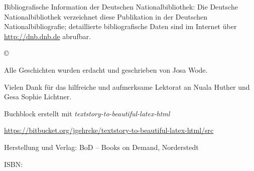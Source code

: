 \thispagestyle{empty}

\vspace*{\fill}

{\small
\noindent
Bibliografische Information der Deutschen Nationalbibliothek:
Die Deutsche Nationalbibliothek verzeichnet diese Publikation in der Deutschen Nationalbibliografie; detaillierte bibliografische Daten sind im Internet über 
\url{http://dnb.dnb.de} abrufbar.

\vspace*{0.06\textheight}
\noindent
© {\the\year} \storyauthor

\vspace{0.03\textheight}\noindent
Alle Geschichten wurden erdacht und geschrieben von Josa Wode.

\vspace{0.03\textheight}\noindent
Vielen Dank für das hilfreiche und aufmerksame Lektorat an Nuala Huther und Gesa Sophie Lichtner.

\vspace{0.03\textheight}\noindent
Buchblock erstellt mit \textit{textstory-to-beautiful-latex-html}

{\noindent\scriptsize \url{https://bitbucket.org/jgehrcke/textstory-to-beautiful-latex-html/src}}

\vspace*{0.06\textheight}\noindent
Herstellung und Verlag: BoD –  Books on Demand, Norderstedt

\vspace*{0.03\textheight}
\noindent
ISBN: \isbn
}